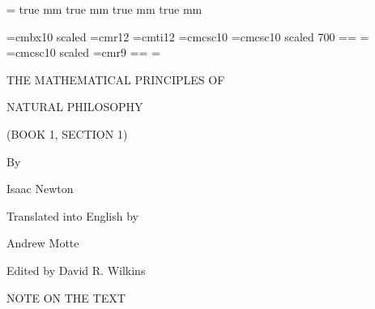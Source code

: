 %

\magnification=
 true mm  true mm
    true mm  true mm

\def\folio{\ifnum\pageno>0 \number\pageno \else
   \ifnum\pageno<0 \romannumeral-\pageno \else\fi\fi}


\font\Largebf=cmbx10  scaled 
\font\largerm=cmr12
\font\largeit=cmti12
\font\tensc=cmcsc10
\font\sevensc=cmcsc10 scaled 700
\newfam\scfam \def\sc{\fam\scfam\tensc}
\textfont\scfam=\tensc \scriptfont\scfam=\sevensc
\scriptscriptfont\scfam=\sevensc
\font\largesc=cmcsc10 scaled 
\font\ninerm=cmr9
\newfam\srfam \def\sr{\fam\srfam\ninerm}
\textfont\srfam=\ninerm \scriptfont\srfam=\sevenrm
\scriptscriptfont\srfam=\fiverm




\null\vskip72pt

\centerline{\Largebf THE MATHEMATICAL PRINCIPLES OF}

\vskip12pt

\centerline{\Largebf NATURAL PHILOSOPHY}

\vskip24pt

\centerline{\Largebf (BOOK 1, SECTION 1)}

\vskip24pt

\centerline{\Largebf By}

\vskip24pt

\centerline{\Largebf Isaac Newton}

\vskip24pt

\centerline{\Largebf Translated into English by}

\vskip24pt

\centerline{\Largebf Andrew Motte}

\vskip36pt

\vfill

\centerline{\largerm Edited by David R. Wilkins}

\vskip 12pt

\centerline{}

\vskip36pt\eject


\null\vskip36pt

\centerline{\Largebf NOTE ON THE TEXT}

\bigskip

